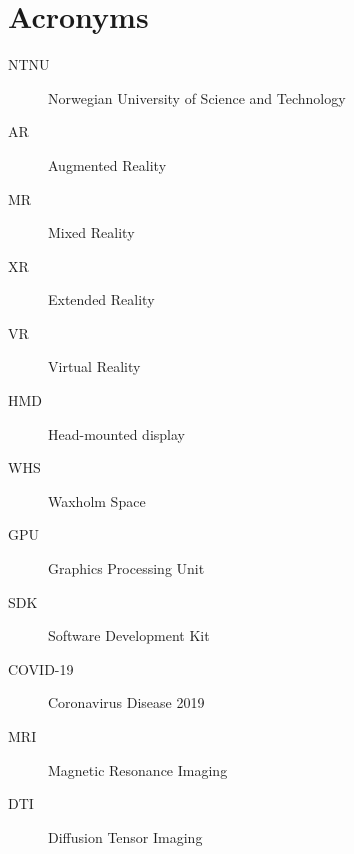 
\chapter{Acronyms}
\begin{description}
\item[NTNU] Norwegian University of Science and Technology
\item[AR] Augmented Reality
\item[MR] Mixed Reality
\item[XR] Extended Reality
\item[VR] Virtual Reality
\item[HMD] Head-mounted display
\item[WHS] Waxholm Space
\item[GPU] Graphics Processing Unit
\item[SDK] Software Development Kit
\item[COVID-19] Coronavirus Disease 2019
\item[MRI] Magnetic Resonance Imaging 
\item[DTI] Diffusion Tensor Imaging 
\end{description}